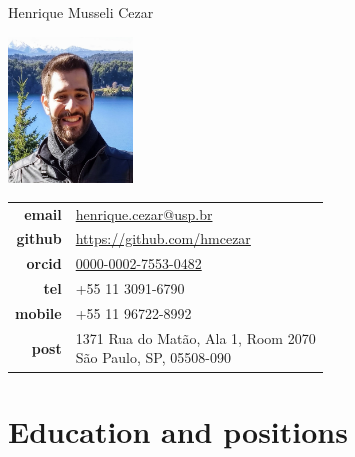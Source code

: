 \documentclass[10pt]{article}
\begin{document}
\reversemarginpar
{\selectfont \LARGE Henrique Musseli Cezar}\\[0.5cm]

\begin{minipage}[t]{2.5in}
\hspace{35pt}
\includegraphics[width=1.3in,valign=c]{images/henrique.jpg}
\end{minipage}
\begin{minipage}[t]{3in}
\begin{tabular}{rl}
{\bf email} & \href{mailto:henrique.cezar@usp.br}{\href{mailto:henrique.cezar@usp.br}{henrique.cezar@usp.br}}\\[0.05in]
{\bf github} & \href{https://github.com/hmcezar}{https://github.com/hmcezar}\\[0.05in]
{\bf orcid} & \href{https://orcid.org/0000-0002-7553-0482}{0000-0002-7553-0482}\\[0.05in]
{\bf tel} & +55 11 3091-6790\\[0.05in]
{\bf mobile} & +55 11 96722-8992\\[0.05in]
{\bf post} & 
\parbox[t]{3.0in}{
1371 Rua do Mat\~ao, Ala 1, Room 2070\\
S\~ao Paulo, SP, 05508-090}
\end{tabular}
\end{minipage}

\vspace{15pt} 

\noindent{}


\section*{Education and positions}
\end{document}
